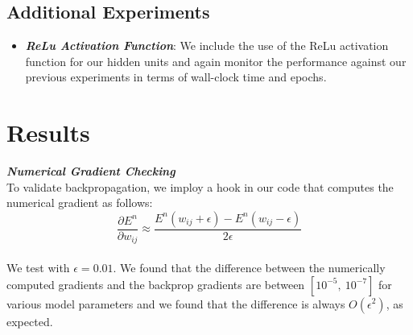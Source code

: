 \documentclass{article} %
\begin{document}
\subsection*{Additional Experiments}
\begin{itemize}
\item \textbf{\textit{ReLu Activation Function}}: We include the use of the ReLu activation function for our hidden units and again monitor the performance against our previous experiments in terms of wall-clock time and epochs.
\end{itemize}

\section*{Results}

\textbf{\textit{Numerical Gradient Checking}} \\ 

To validate backpropagation, we imploy a hook in our code that computes the numerical gradient as follows: $$\frac{\partial E^n}{\partial w_{ij}} \approx \frac{E^n(w_{ij} + \epsilon) - E^n(w_{ij} - \epsilon)}{2\epsilon}$$ \\ 

We test with $\epsilon = 0.01$.  We found that the difference between the numerically computed gradients and the backprop gradients are between $[10^{-5}, \ 10^{-7}]$ for various model parameters and we found that the difference is always $O(\epsilon^2)$, as expected. \\
\end{document}
